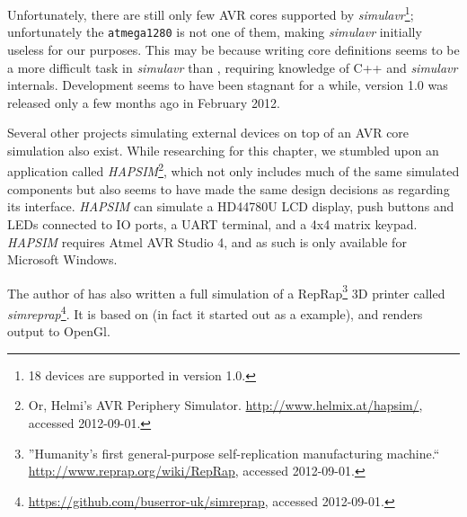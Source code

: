 Unfortunately, there are still only few \ac{AVR} cores supported by \emph{simulavr}\footnote{
%
18 devices are supported in version 1.0.
%
}; unfortunately the \verb|atmega1280| is not one of them, making \emph{simulavr}
initially useless for our purposes. This may be because writing core definitions
seems to be a more difficult task in \emph{simulavr} than \simavr, requiring
knowledge of C++ and \emph{simulavr} internals.
Development seems to have been stagnant for a while, version 1.0 was
released only a few months ago in February 2012.

Several other projects simulating external devices on top of an \ac{AVR} core
simulation also exist. While researching for this chapter, we stumbled upon
an application called \emph{HAPSIM}\footnote{
%
Or, Helmi's \ac{AVR} Periphery Simulator. \url{http://www.helmix.at/hapsim/}, accessed 2012-09-01.
%
}, which not only includes much of the same simulated components but also
seems to have made the same design decisions as \qsimavr regarding its interface.
\emph{HAPSIM} can simulate a HD44780U LCD display, push buttons and \acp{LED}
connected to \ac{IO} ports, a \ac{UART} terminal, and a 4x4 matrix keypad.
\emph{HAPSIM} requires Atmel AVR Studio 4, and as such is only available for
Microsoft Windows.

The author of \simavr has also written a full simulation of a RepRap\footnote{
%
''Humanity's first general-purpose self-replication manufacturing machine.``
\url{http://www.reprap.org/wiki/RepRap}, accessed 2012-09-01.
%
} 3D printer called \emph{simreprap}\footnote{
%
\url{https://github.com/buserror-uk/simreprap}, accessed 2012-09-01.
%
}. It is based on \simavr (in fact it started out as a \simavr example),
and renders output to OpenGl.
